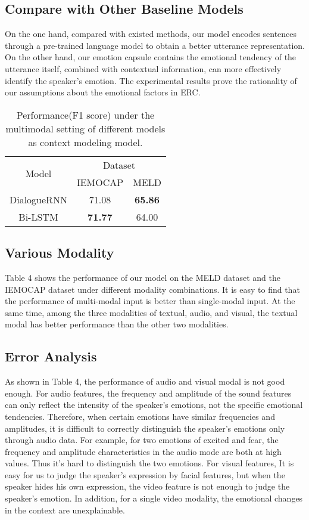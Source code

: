 \documentclass[11pt]{article}
\begin{document}
\subsection{Compare with Other Baseline Models}
On the one hand, compared with existed methods, our model encodes sentences through a pre-trained language model to obtain a better utterance representation. On the other hand, our emotion capsule contains the emotional tendency of the utterance itself, combined with contextual information, can more effectively identify the speaker's emotion. The experimental results prove the rationality of our assumptions about the emotional factors in ERC.
\begin{table}[]
	\centering
	\begin{tabular}{c|c|c}
		\hline
		\multirow{2}{*}{Model} & \multicolumn{2}{c}{Dataset}    \\ \cline{2-3} 
		& IEMOCAP        & MELD           \\ \hline
		DialogueRNN            & 71.08          & \textbf{65.86} \\
		Bi-LSTM                & \textbf{71.77} & 64.00          \\ \hline
	\end{tabular}
	\caption{Performance(F1 score) under the multimodal setting of different models as context modeling model.}
\end{table}
\subsection{Various Modality}
Table 4 shows the performance of our model on the MELD dataset and the IEMOCAP dataset under different modality combinations. It is easy to find that the performance of multi-modal input is better than single-modal input. At the same time, among the three modalities of textual, audio, and visual, the textual modal has better performance than the other two modalities. 




\subsection{Error Analysis}
As shown in Table 4, the performance of audio and visual modal is not good enough. For audio features, the frequency and amplitude of the sound features can only reflect the intensity of the speaker's emotions, not the specific emotional tendencies. Therefore, when certain emotions have similar frequencies and amplitudes, it is difficult to correctly distinguish the speaker's emotions only through audio data. For example, for two emotions of excited and fear, the frequency and amplitude characteristics in the audio mode are both at high values. Thus it's hard to distinguish the two emotions. For visual features, It is easy for us to judge the speaker's expression by facial features, but when the speaker hides his own expression, the video feature is not enough to judge the speaker's emotion. In addition, for a single video modality, the emotional changes in the context are unexplainable. 
\end{document}

